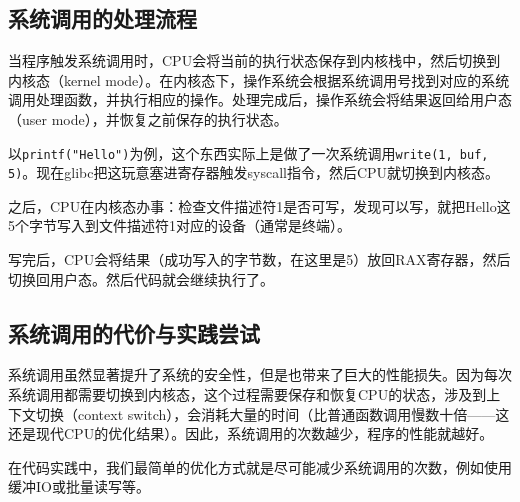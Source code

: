 \subsection{系统调用的处理流程}

当程序触发系统调用时，CPU会将当前的执行状态保存到内核栈中，然后切换到内核态（kernel mode）。在内核态下，操作系统会根据系统调用号找到对应的系统调用处理函数，并执行相应的操作。处理完成后，操作系统会将结果返回给用户态（user mode），并恢复之前保存的执行状态。

以\texttt{printf("Hello")}为例，这个东西实际上是做了一次系统调用\texttt{write(1, buf, 5)}。现在glibc把这玩意塞进寄存器触发syscall指令，然后CPU就切换到内核态。

之后，CPU在内核态办事：检查文件描述符1是否可写，发现可以写，就把Hello这5个字节写入到文件描述符1对应的设备（通常是终端）。

写完后，CPU会将结果（成功写入的字节数，在这里是5）放回RAX寄存器，然后切换回用户态。然后代码就会继续执行了。

\subsection{系统调用的代价与实践尝试}

系统调用虽然显著提升了系统的安全性，但是也带来了巨大的性能损失。因为每次系统调用都需要切换到内核态，这个过程需要保存和恢复CPU的状态，涉及到上下文切换（context switch），会消耗大量的时间（比普通函数调用慢数十倍——这还是现代CPU的优化结果）。因此，系统调用的次数越少，程序的性能就越好。

在代码实践中，我们最简单的优化方式就是尽可能减少系统调用的次数，例如使用缓冲IO或批量读写等。

